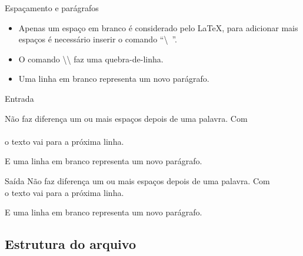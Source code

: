 \documentclass{beamer}
\begin{document}
\begin{frame}[fragile]{Espaçamento e parágrafos}
	\begin{itemize}
	\item Apenas um espaço em branco é considerado pelo \LaTeX, para adicionar mais espaços é necessário inserir o comando \alert{``\textbackslash\ ''}.
	\item O comando \alert{\textbackslash\textbackslash} faz uma quebra-de-linha.
	\item Uma linha em branco representa um novo parágrafo.
	\end{itemize}

    
    \begin{block}{Entrada}
        \small
        \begin{semiverbatim}
\small{}Não faz diferença um ou mais        espaços depois de uma
palavra. Com \\\\ o texto vai para a próxima linha.

E uma linha em branco representa um novo parágrafo.
\end{semiverbatim}
    \end{block}    
    
    \begin{block}{Saída}
        \small
        Não faz diferença um ou mais       espaços depois de uma palavra. Com \\ o texto vai para a próxima linha.

        E uma linha em branco representa um novo parágrafo.
    \end{block}
\end{frame}

\subsection{Estrutura do arquivo}
\end{document}
